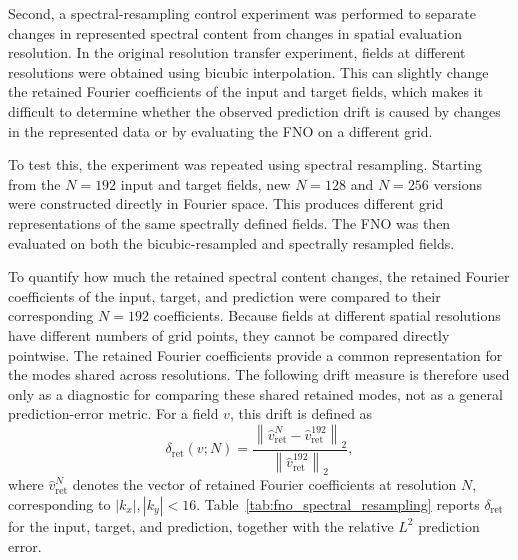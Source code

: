 Second, a spectral-resampling control experiment was performed to separate changes in represented spectral content from changes in spatial evaluation resolution. In the original resolution transfer experiment, fields at different resolutions were obtained using bicubic interpolation. This can slightly change the retained Fourier coefficients of the input and target fields, which makes it difficult to determine whether the observed prediction drift is caused by changes in the represented data or by evaluating the FNO on a different grid.

To test this, the experiment was repeated using spectral resampling. Starting from the \(N=192\) input and target fields, new \(N=128\) and \(N=256\) versions were constructed directly in Fourier space. This produces different grid representations of the same spectrally defined fields. The FNO was then evaluated on both the bicubic-resampled and spectrally resampled fields.

To quantify how much the retained spectral content changes, the retained Fourier coefficients of the input, target, and prediction were compared to their corresponding \(N=192\) coefficients. Because fields at different spatial resolutions have different numbers of grid points, they cannot be compared directly pointwise. The retained Fourier coefficients provide a common representation for the modes shared across resolutions. The following drift measure is therefore used only as a diagnostic for comparing these shared retained modes, not as a general prediction-error metric. For a field \(v\), this drift is defined as
\begin{equation}
\delta_{\mathrm{ret}}(v;N)
=
\frac{
\left\|\hat v_{\mathrm{ret}}^{N}-\hat v_{\mathrm{ret}}^{192}\right\|_2
}{
\left\|\hat v_{\mathrm{ret}}^{192}\right\|_2
},
\label{eq:retained-mode-drift}
\end{equation}
where \(\hat v_{\mathrm{ret}}^{N}\) denotes the vector of retained Fourier coefficients at resolution \(N\), corresponding to \(|k_x|,|k_y|<16\). Table~\ref{tab:fno_spectral_resampling} reports \(\delta_{\mathrm{ret}}\) for the input, target, and prediction, together with the relative \(L^2\) prediction error.

